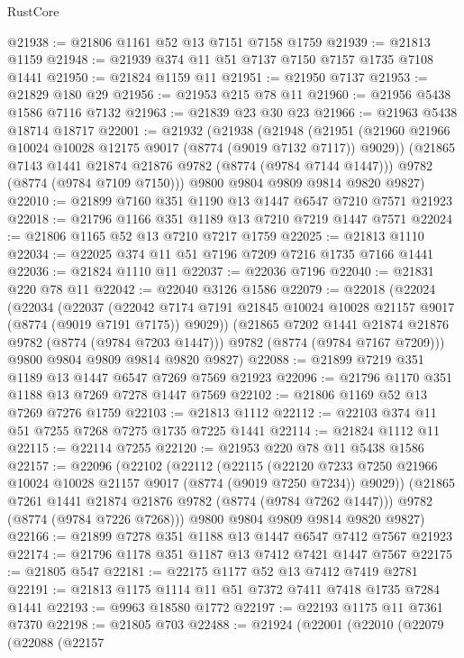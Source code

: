 \begin{lexlean}{RustCore}
\begin{coremodule}
@21938 := @21806 @1161 @52 @13 @7151 @7158 @1759
@21939 := @21813 @1159
@21948 := @21939 @374 @11 @51 @7137 @7150 @7157 @1735 @7108 @1441
@21950 := @21824 @1159 @11
@21951 := @21950 @7137
@21953 := @21829 @180 @29
@21956 := @21953 @215 @78 @11
@21960 := @21956 @5438 @1586 @7116 @7132
@21963 := @21839 @23 @30 @23
@21966 := @21963 @5438 @18714 @18717
@22001 := @21932
    (@21938
      (@21948
        (@21951 (@21960 @21966 @10024 @10028 @12175 @9017 (@8774 (@9019 @7132 @7117)) @9029))
        (@21865 @7143 @1441 @21874 @21876 @9782 (@8774 (@9784 @7144 @1447)))
        @9782
        (@8774 (@9784 @7109 @7150)))
      @9800
      @9804
      @9809
      @9814
      @9820
      @9827)
@22010 := @21899 @7160 @351 @1190 @13 @1447 @6547 @7210 @7571 @21923
@22018 := @21796 @1166 @351 @1189 @13 @7210 @7219 @1447 @7571
@22024 := @21806 @1165 @52 @13 @7210 @7217 @1759
@22025 := @21813 @1110
@22034 := @22025 @374 @11 @51 @7196 @7209 @7216 @1735 @7166 @1441
@22036 := @21824 @1110 @11
@22037 := @22036 @7196
@22040 := @21831 @220 @78 @11
@22042 := @22040 @3126 @1586
@22079 := @22018
    (@22024
      (@22034
        (@22037
          (@22042 @7174 @7191 @21845 @10024 @10028 @21157 @9017 (@8774 (@9019 @7191 @7175)) @9029))
        (@21865 @7202 @1441 @21874 @21876 @9782 (@8774 (@9784 @7203 @1447)))
        @9782
        (@8774 (@9784 @7167 @7209)))
      @9800
      @9804
      @9809
      @9814
      @9820
      @9827)
@22088 := @21899 @7219 @351 @1189 @13 @1447 @6547 @7269 @7569 @21923
@22096 := @21796 @1170 @351 @1188 @13 @7269 @7278 @1447 @7569
@22102 := @21806 @1169 @52 @13 @7269 @7276 @1759
@22103 := @21813 @1112
@22112 := @22103 @374 @11 @51 @7255 @7268 @7275 @1735 @7225 @1441
@22114 := @21824 @1112 @11
@22115 := @22114 @7255
@22120 := @21953 @220 @78 @11 @5438 @1586
@22157 := @22096
    (@22102
      (@22112
        (@22115
          (@22120 @7233 @7250 @21966 @10024 @10028 @21157 @9017 (@8774 (@9019 @7250 @7234)) @9029))
        (@21865 @7261 @1441 @21874 @21876 @9782 (@8774 (@9784 @7262 @1447)))
        @9782
        (@8774 (@9784 @7226 @7268)))
      @9800
      @9804
      @9809
      @9814
      @9820
      @9827)
@22166 := @21899 @7278 @351 @1188 @13 @1447 @6547 @7412 @7567 @21923
@22174 := @21796 @1178 @351 @1187 @13 @7412 @7421 @1447 @7567
@22175 := @21805 @547
@22181 := @22175 @1177 @52 @13 @7412 @7419 @2781
@22191 := @21813 @1175 @1114 @11 @51 @7372 @7411 @7418 @1735 @7284 @1441
@22193 := @9963 @18580 @1772
@22197 := @22193 @1175 @11 @7361 @7370
@22198 := @21805 @703
@22488 := @21924
    (@22001
      (@22010
        (@22079
          (@22088
            (@22157

\end{coremodule}
\end{lexlean}
